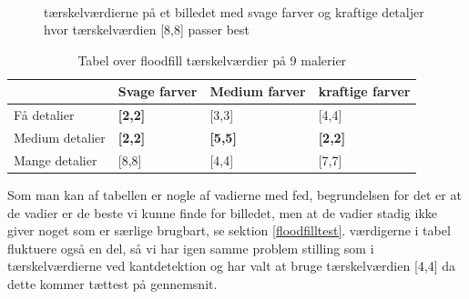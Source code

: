 \begin{figure}[!h]
    \centering
    \\
    \caption[]{tærskelværdierne på et billedet med svage farver og kraftige detaljer hvor tærskelværdien [8,8] passer best}
    \label{Floodfillbilledet}
\end{figure}

\begin{table}[!h]
    \centering
    \begin{tabular}{| l | l | l | l |} \hline
        & Svage farver 		& Medium farver & kraftige farver \\ \hline
        Få detalier 		& \textbf{[2,2]}	& [3,3]			& [4,4]\\ \hline
        Medium detalier 	& \textbf{[2,2]}	& \textbf{[5,5]}& \textbf{[2,2]}\\ \hline
        Mange detalier		& [8,8]				& [4,4]			& [7,7]\\ \hline
    \end{tabular}
    \caption{Tabel over floodfill tærskelværdier på 9 malerier}
    \label{thressholdsTabelFF}
\end{table}

Som man kan af tabellen er nogle af vadierne med fed, begrundelsen for det er
at de vadier er de beste vi kunne finde for billedet, men at de vadier stadig
ikke giver noget som er særlige brugbart, se sektion \ref{floodfilltest}.
værdigerne i tabel fluktuere også en del, så vi har igen samme problem stilling
som i tærskelværdierne ved kantdetektion og har valt at bruge tærskelværdien
[4,4] da dette kommer tættest på gennemsnit.
